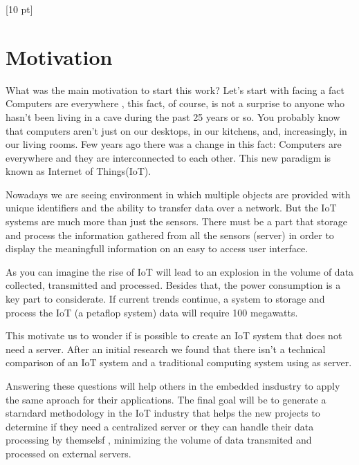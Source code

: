 \titleformat{\chapter}{\Huge\bfseries}{\thechapter}{0 pt}{\rule{340 pt}{3 pt}\\}
\titlespacing{\chapter}{100 pt}{-25 pt}{40 pt}[10 pt]	
\pagestyle{fancy}
\fancyhead[RO,RE]{\thepage}
\fancyfoot[CO,CE]{}

\chapter*{Motivation}

\normalsize
\noindent


What was the main motivation to start this work? Let's start with facing a fact
Computers are everywhere , this fact, of course, is not a surprise to anyone
who hasn't been living in a cave during the past 25 years or so. You probably
know that computers aren't just on our desktops, in our kitchens, and,
increasingly, in our living rooms. Few years ago there was a change in this
fact: Computers are everywhere and they are interconnected to each other.  This
new paradigm is known as Internet of Things(IoT). 

Nowadays we are seeing environment in which multiple objects are provided with
unique identifiers and the ability to transfer data over a network. But the IoT
systems are much more than just the sensors. There must be a part that storage
and process the information gathered from all the sensors (server) in order to
display the meaningfull information on an easy to access user interface. 

As you can imagine the rise of IoT will lead to an explosion in the volume of
data collected, transmitted and processed. Besides that, the power consumption
is a key part to considerate. If current trends continue, a system to storage
and process the IoT (a petaflop system) data will require 100 megawatts. 

This motivate us to wonder if is possible to create an IoT system that does
not need a server. After an initial research we found that there isn't a
technical comparison of an  IoT system and a traditional computing system
using as server. 

Answering these questions will help others in the embedded insdustry to apply
the same aproach for their applications. The final goal will be to generate a
starndard methodology in the IoT industry that helps the new projects to
determine if they need a centralized  server or they can handle their data
processing by themselsf , minimizing the volume of data transmited and
processed on external servers. 


\clearpage
